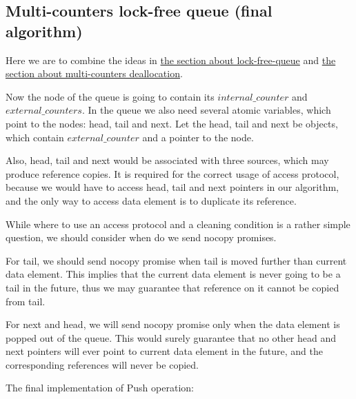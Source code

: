 \documentclass{article}
\begin{document}
\subsection{Multi-counters lock-free queue (final algorithm)}
\label{subsec:dealloc_lock_free_queue}

Here we are to combine the ideas in \hyperref[subsec:lock_free_queue]{the section about lock-free-queue} and \hyperref[subsec:three_counters] {the section about multi-counters deallocation}.

Now the node of the queue is going to contain its $internal\_counter$ and $external\_counters$. In the queue we also need several atomic variables, which point to the nodes: head, tail and next. Let the head, tail and next be objects, which contain $external\_counter$ and a pointer to the node.

Also, head, tail and next would be associated with three sources, which may produce reference copies. It is required for the correct usage of access protocol, because we would have to access head, tail and next pointers in our algorithm, and the only way to access data element is to duplicate its reference.

While where to use an access protocol and a cleaning condition is a rather simple question, we should consider when do we send nocopy promises.

For tail, we should send nocopy promise when tail is moved further than current data element. This implies that the current data element is never going to be a tail in the future, thus we may guarantee that reference on it cannot be copied from tail.

For next and head, we will send nocopy promise only when the data element is popped out of the queue. This would surely guarantee that no other head and next pointers will ever point to current data element in the future, and the corresponding references will never be copied.

The final implementation of Push operation:
\end{document}
